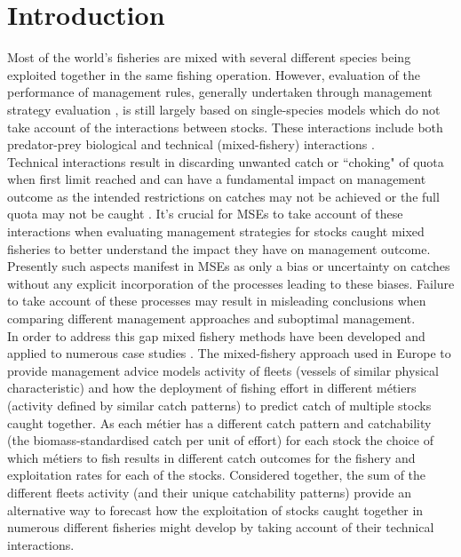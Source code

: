 \documentclass[12pt, halfline, a4paper]{ouparticle}
\begin{document}
\date{\today}


\maketitle

\section{Introduction}
\label{intro}

Most of the world's fisheries are mixed with several different species being
exploited together in the same fishing operation. However, evaluation of the
performance of management rules, generally undertaken through management
strategy evaluation \citep[MSE,][]{Punt2014}, is still largely based on
single-species models which do not take account of the interactions between
stocks. These interactions include both predator-prey biological
\citep{Thorpe2016} and technical (mixed-fishery) interactions
\citep{Ulrich2001}. \\

Technical interactions result in discarding unwanted catch or ``choking" of
quota when first limit reached and can have a fundamental impact on management
outcome as the intended restrictions on catches may not be achieved or the full
quota may not be caught \citep[known in MSE frameworks as ``implementation
error",][]{Ulrich2011}. It's crucial for MSEs to take account of these
interactions when evaluating management strategies for stocks caught mixed
fisheries to better understand the impact they have on management outcome.
Presently such aspects manifest in MSEs as only a bias or uncertainty on
catches \citep{Dichmont2006} without any explicit incorporation of the
processes leading to these biases. Failure to take account of these processes
may result in misleading conclusions when comparing different management
approaches and suboptimal management. \\

In order to address this gap mixed fishery methods have been developed and
applied to numerous case studies \citep{Ulrich2011, Ulrich2016, Iriondo2012a,
	Garcia2020}. The mixed-fishery approach used in Europe to provide
management advice \citep{ICES2019} models activity of fleets (vessels of
similar physical characteristic) and how the deployment of fishing effort in
different métiers (activity defined by similar catch patterns) to predict catch
of multiple stocks caught together. As each métier has a different catch
pattern and catchability (the biomass-standardised catch per unit of effort)
for each stock the choice of which métiers to fish results in different catch
outcomes for the fishery and exploitation rates for each of the stocks.
Considered together, the sum of the different fleets activity (and their unique
catchability patterns) provide an alternative way to forecast how the
exploitation of stocks caught together in numerous different fisheries might
develop by taking account of their technical interactions. \\ 
\end{document}
